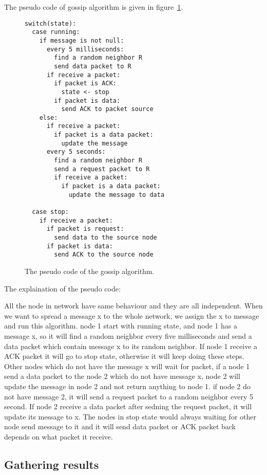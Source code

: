 \documentclass[12pt,journal]{IEEEtran}
\begin{document}
The pseudo code of gossip algorithm is given in figure~\ref{fig:pseudo}.

\begin{figure}
 \centering
 \begin{verbatim}
switch(state):
  case running:
    if message is not null:
      every 5 milliseconds:
        find a random neighbor R
        send data packet to R
      if receive a packet:
        if packet is ACK:
          state <- stop
        if packet is data:
          send ACK to packet source
    else:
      if receive a packet:
        if packet is a data packet:
          update the message
      every 5 seconds:
        find a random neighbor R
        send a request packet to R
        if receive a packet:
          if packet is a data packet:
            update the message to data
                    
  case stop:
    if receive a packet:
      if packet is request:
        send data to the source node
      if packet is data:
        send ACK to the source node
\end{verbatim}
 \caption{The pseudo code of the gossip algorithm.}
 \label{fig:pseudo}
\end{figure}

The explaination of the pseudo code: 

All the node in network have same behaviour and they are all independent. When we want to spread a message x to the whole network, we assign the x to message and run this algorithm. node 1 start with running state, and node 1 has a message x, so it will find a random neighbor every five milliseconds and send a data packet which contain message x to its random neighbor. If node 1 receive a ACK packet it will go to stop state, otherwise it will keep doing these steps. Other nodes which do not have the message x will wait for packet, if a node 1 send a data packet to the node 2 which do not have message x, node 2 will update the message in node 2 and not return anything to node 1. if node 2 do not have message 2, it will send a request packet to a random neighbor every 5 second. If node 2 receive a data packet after sedning the request packet, it will update its message to x. The nodes in stop state would always waiting for other node send message to it and it will send data packet or ACK packet back depends on what packet it receive.

\subsection{Gathering results}
\end{document}
